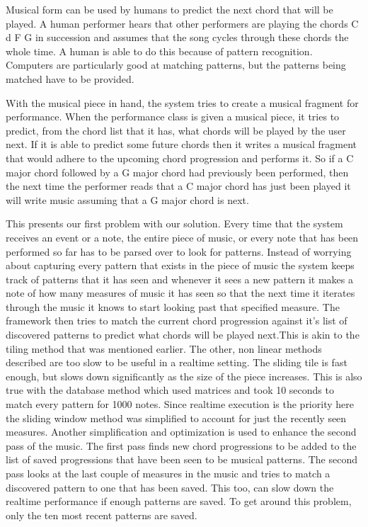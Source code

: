 \documentclass[12pt]{ucthesis}
\begin{document}
{Musical form can be used by humans to predict the next chord that will be played. A human performer hears that other performers are playing the chords C d F G in succession and assumes that the song cycles through these chords the whole time. A human is able to do this because of pattern recognition. Computers are particularly good at matching patterns, but the patterns being matched have to be provided.

With the musical piece in hand, the system tries to create a musical fragment for performance. When the performance class is given a musical piece, it tries to predict, from the chord list that it has, what chords will be played by the user next. If it is able to predict some future chords then it writes a musical fragment that would adhere to the upcoming chord progression and performs it. So if a C major chord followed by a G major chord had previously been performed, then the next time the performer reads that a C major chord has just been played it will write music assuming that a G major chord is next. 

This presents our first problem with our solution. Every time that the system receives an event or a note, the entire piece of music, or every note that has been performed so far has to be parsed over to look for patterns. Instead of worrying about capturing every pattern that exists in the piece of music the system keeps track of patterns that it has seen and whenever it sees a new pattern it makes a note of how many measures of music it has seen so that the next time it iterates through the music it knows to start looking past that specified measure. The framework then tries to match the current chord progression against it's list of discovered patterns to predict what chords will be played next.This is akin to the tiling method that was mentioned earlier. The other, non linear methods described are too slow to be useful in a realtime setting. The sliding tile is fast enough, but slows down significantly as the size of the piece increases. This is also true with the database method which used matrices and took 10 seconds to match every pattern for 1000 notes. Since realtime execution is the priority here the sliding window method was simplified to account for just the recently seen measures. Another simplification and optimization is used to enhance the second pass of the music. The first pass finds new chord progressions to be added to the list of saved progressions that have been seen to be musical patterns. The second pass looks at the last couple of measures in the music and tries to match a discovered pattern to one that has been saved. This too, can slow down the realtime performance if enough patterns are saved. To get around this problem, only the ten most recent patterns are saved. 


}
\end{document}
